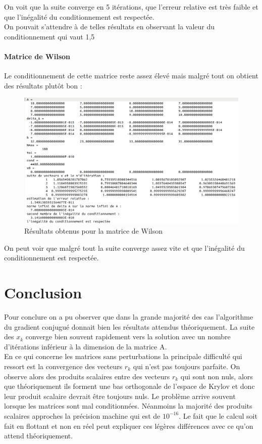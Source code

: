 \documentclass[12,french]{report}
\begin{document}
On voit que la suite converge en 5 itérations, que l'erreur relative est très faible et que l'inégalité du conditionnement est respectée.\\
On pouvait s'attendre à de telles résultats en observant la valeur du conditionnement qui vaut 1,5

\subsubsection{Matrice de Wilson}

Le conditionnement de cette matrice reste assez élevé mais malgré tout on obtient des résultats plutôt bon :\\

\begin{figure}[H]
	\centering
	\includegraphics[width=1\textwidth]{./Images/W_1.res}
	\caption{Résultats obtenus pour la matrice de Wilson}
\end{figure}

On peut voir que malgré tout la suite converge assez vite et que l'inégalité du conditionnement est respectée.

\chapter*{Conclusion}

Pour conclure on a pu observer que dans la grande majorité des cas l'algorithme du gradient conjugué donnait bien les résultats attendus théoriquement. La suite des $x_{k}$ converge bien souvent rapidement vers la solution avec un nombre d'itérations inférieur à la dimension de la matrice A.\\

En ce qui concerne les matrices sans perturbations la principale difficulté qui ressort est la convergence des vecteurs $r_{k}$ qui n'est pas toujours parfaite. On observe alors des produits scalaires entre des vecteurs $r_{k}$ qui sont non nuls, alors que théoriquement ils forment une bas orthogonale de l'espace de Krylov et donc leur produit scalaire devrait être toujours nuls. Le problème arrive souvent lorsque les matrices sont mal conditionnées. Néanmoins la majorité des produits scalaires approches la précision machine qui est de $10^{-16}$. Le fait que le calcul soit fait en flottant et non en réel peut expliquer ces légères différences avec ce qu'on attend théoriquement.\\
\end{document}
